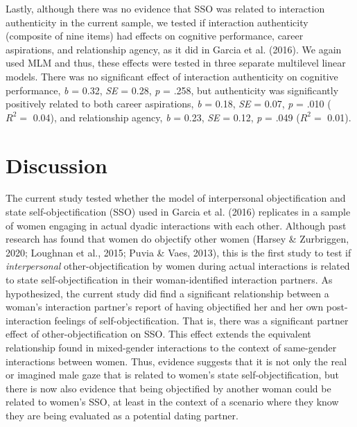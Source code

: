 \documentclass[man]{apa6}
\begin{document}
Lastly, although there was no evidence that SSO was related to
interaction authenticity in the current sample, we tested if interaction
authenticity (composite of nine items) had effects on cognitive
performance, career aspirations, and relationship agency, as it did in
Garcia et al. (2016). We again used MLM and thus, these effects were
tested in three separate multilevel linear models. There was no
significant effect of interaction authenticity on cognitive performance,
\emph{b} = 0.32, \emph{SE} = 0.28, \emph{p} = .258, but authenticity was
significantly positively related to both career aspirations, \emph{b} =
0.18, \emph{SE} = 0.07, \emph{p} = .010 (\(R^2 =\) 0.04), and
relationship agency, \emph{b} = 0.23, \emph{SE} = 0.12, \emph{p} = .049
(\(R^2 =\) 0.01).

\section{Discussion}\label{discussion}

The current study tested whether the model of interpersonal
objectification and state self-objectification (SSO) used in Garcia et
al. (2016) replicates in a sample of women engaging in actual dyadic
interactions with each other. Although past research has found that
women do objectify other women (Harsey \& Zurbriggen, 2020; Loughnan et
al., 2015; Puvia \& Vaes, 2013), this is the first study to test if
\emph{interpersonal} other-objectification by women during actual
interactions is related to state self-objectification in their
woman-identified interaction partners. As hypothesized, the current
study did find a significant relationship between a woman's interaction
partner's report of having objectified her and her own post-interaction
feelings of self-objectification. That is, there was a significant
partner effect of other-objectification on SSO. This effect extends the
equivalent relationship found in mixed-gender interactions to the
context of same-gender interactions between women. Thus, evidence
suggests that it is not only the real or imagined male gaze that is
related to women's state self-objectification, but there is now also
evidence that being objectified by another woman could be related to
women's SSO, at least in the context of a scenario where they know they
are being evaluated as a potential dating partner.
\end{document}
